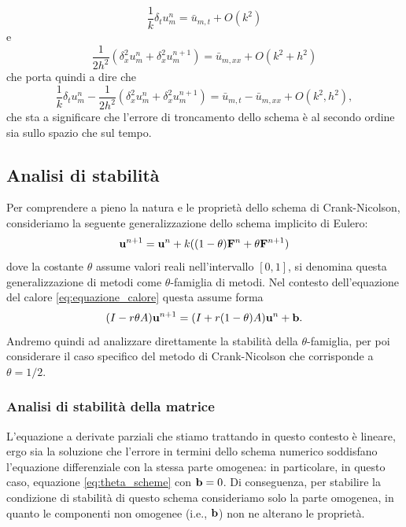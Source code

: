 \documentclass[10pt,a4paper]{article}
\begin{document}
\begin{equation}
	\frac{1}{k} \delta_t u_m^n = \bar{u}_{m,t} + O(k^2)
\end{equation}
e
\begin{equation}
	\frac{1}{2h^2}(\delta_x^2 u_m^n + \delta_x^2 u_m^{n+1}) = \bar{u}_{m,xx} + O(k^2 + h^2)
\end{equation}
che porta quindi a dire che
\begin{equation}
	\frac{1}{k} \delta_t u_m^n - \frac{1}{2h^2}(\delta_x^2 u_m^n + \delta_x^2 u_m^{n+1}) = \bar{u}_{m,t} - \bar{u}_{m,xx} + O(k^2, h^2),
\end{equation}
che sta a significare che l'errore di troncamento dello schema è al secondo ordine sia sullo spazio che sul tempo.

\subsection{Analisi di stabilità}

Per comprendere a pieno la natura e le proprietà dello schema di Crank-Nicolson, consideriamo la seguente generalizzazione dello schema implicito di Eulero:
\begin{equation}
	\vb{u}^{n+1} = \vb{u}^n + k((1-\theta)\vb{F}^{n} + \theta \vb{F}^{n+1})
\end{equation}
dove la costante $\theta$ assume valori reali nell'intervallo $[0,1]$, si denomina questa generalizzazione di metodi come $\theta$-famiglia di metodi. Nel contesto dell'equazione del calore \eqref{eq:equazione_calore} questa assume forma
\begin{equation}
	(I-r\theta A)\vb{u}^{n+1} = (I+r(1-\theta)A)\vb{u}^n + \vb{b}.
	\label{eq:theta_scheme}
\end{equation}
Andremo quindi ad analizzare direttamente la stabilità della $\theta$-famiglia, per poi considerare il caso specifico del metodo di Crank-Nicolson che corrisponde a $\theta = 1/2$.

\subsubsection{Analisi di stabilità della matrice}
\label{sec:stabilita_matrice}

L'equazione a derivate parziali che stiamo trattando in questo contesto è lineare, ergo sia la soluzione che l'errore in termini dello schema numerico soddisfano l'equazione differenziale con la stessa parte omogenea: in particolare, in questo caso, equazione \eqref{eq:theta_scheme} con $\vb{b}=0$. Di conseguenza, per stabilire la condizione di stabilità di questo schema consideriamo solo la parte omogenea, in quanto le componenti non omogenee (i.e., $\vb{b}$) non ne alterano le proprietà.
\end{document}
